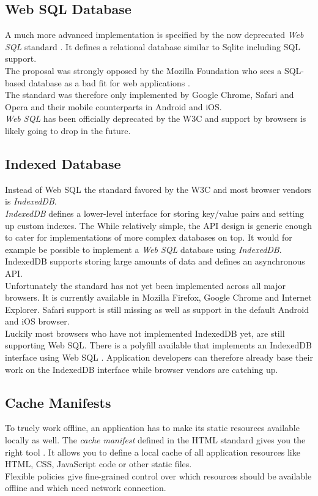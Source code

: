 \subsection{Web SQL Database}
A much more advanced implementation is specified by the now deprecated \emph{Web SQL} standard \cite{websql}. It defines a relational database similar to Sqlite including SQL support.\\
The proposal was strongly opposed by the Mozilla Foundation who sees a SQL-based database as a bad fit for web applications \cite{mozilla_indexeddb}.\\
The standard was therefore only implemented by Google Chrome, Safari and Opera and their mobile counterparts in Android and iOS.\\
\emph{Web SQL} has been officially deprecated by the W3C and support by browsers is likely going to drop in the future.

\subsection{Indexed Database}
Instead of Web SQL the standard favored by the W3C and most browser vendors is \emph{IndexedDB}.\\
\emph{IndexedDB} defines a lower-level interface for storing key/value pairs and setting up custom indexes.
The While relatively simple, the API design is generic enough to cater for implementations of more complex databases on top.
It would for example be possible to implement a \emph{Web SQL} database using \emph{IndexedDB}.\\
IndexedDB supports storing large amounts of data and defines an asynchronous API.\\
Unfortunately the standard has not yet been implemented across all major browsers.
It is currently available in Mozilla Firefox, Google Chrome and Internet Explorer.
Safari support is still missing as well as support in the default Android and iOS browser.\\
Luckily most browsers who have not implemented IndexedDB yet, are still supporting Web SQL.
There is a polyfill available that implements an IndexedDB interface using Web SQL \cite{indexeddb_polyfill}. Application developers can therefore already base their work on the IndexedDB interface while browser vendors are catching up.

\subsection{Cache Manifests}
To truely work offline, an application has to make its static resources available locally as well.
The \emph{cache manifest} defined in the HTML standard gives you the right tool \cite{cache_manifests}. It allows you to define a local cache of all application resources like HTML, CSS, JavaScript code or other static files.\\
Flexible policies give fine-grained control over which resources should be available offline and which need network connection.
